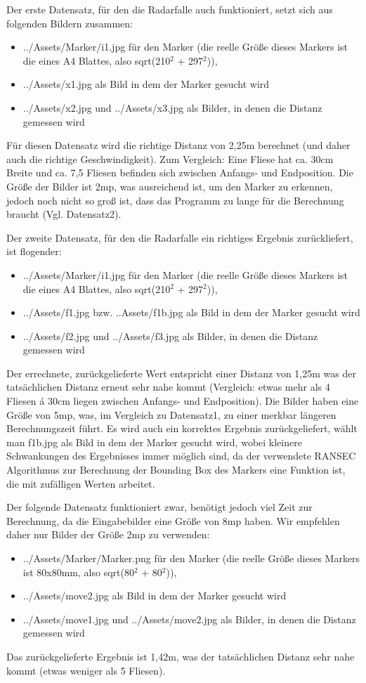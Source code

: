 \documentclass[deutsch]{scrartcl}
\begin{document}
Der erste Datensatz, für den die Radarfalle auch funktioniert, setzt sich aus folgenden Bildern zusammen: 
\begin{itemize}
	\item ../Assets/Marker/i1.jpg für den Marker (die reelle Größe dieses Markers ist die eines A4 Blattes, also sqrt(210$^2$ + 297$^2$)), 
	\item ../Assets/x1.jpg als Bild in dem der Marker gesucht wird
	\item ../Assets/x2.jpg und ../Assets/x3.jpg als Bilder, in denen die Distanz gemessen wird
\end{itemize}
Für diesen Datensatz wird die richtige Distanz von 2,25m berechnet (und daher auch die richtige Geschwindigkeit). Zum Vergleich: Eine Fliese hat ca. 30cm Breite und ca. 7,5 Fliesen befinden sich zwischen Anfangs- und Endposition. Die Größe der Bilder ist 2mp, was ausreichend ist, um den Marker zu erkennen, jedoch noch nicht so groß ist, dass das Programm zu lange für die Berechnung braucht (Vgl. Datensatz2).

Der zweite Datensatz, für den die Radarfalle ein richtiges Ergebnis zurückliefert, ist flogender:
\begin{itemize}
	\item ../Assets/Marker/i1.jpg für den Marker (die reelle Größe dieses Markers ist die eines A4 Blattes, also sqrt(210$^2$ + 297$^2$)), 
	\item ../Assets/f1.jpg bzw. ..Assets/f1b.jpg als Bild in dem der Marker gesucht wird
	\item ../Assets/f2.jpg und ../Assets/f3.jpg als Bilder, in denen die Distanz gemessen wird
\end{itemize}
Der errechnete, zurückgelieferte Wert entspricht einer Distanz von 1,25m was der tatsächlichen Distanz erneut sehr nahe kommt (Vergleich: etwas mehr als 4 Fliesen á 30cm liegen zwischen Anfangs- und Endposition). Die Bilder haben eine Größe von 5mp, was, im Vergleich zu Datensatz1, zu einer merkbar längeren Berechnungszeit führt. Es wird auch ein korrektes Ergebnis zurückgeliefert, wählt man f1b.jpg als Bild in dem der Marker gesucht wird, wobei kleinere Schwankungen des Ergebnisses immer möglich sind, da der verwendete RANSEC Algorithmus zur Berechnung der Bounding Box des Markers eine Funktion ist, die mit zufälligen Werten arbeitet.

Der folgende Datensatz funktioniert zwar, benötigt jedoch viel Zeit zur Berechnung, da die Eingabebilder eine Größe von 8mp haben. Wir empfehlen daher nur Bilder der Größe 2mp zu verwenden:
\begin{itemize}
	\item ../Assets/Marker/Marker.png für den Marker (die reelle Größe dieses Markers ist 80x80mm, also sqrt(80$^2$ + 80$^2$)), 
	\item ../Assets/move2.jpg als Bild in dem der Marker gesucht wird
	\item ../Assets/move1.jpg und ../Assets/move2.jpg als Bilder, in denen die Distanz gemessen wird
\end{itemize}
Das zurückgelieferte Ergebnis ist 1,42m, was der tatsächlichen Distanz sehr nahe kommt (etwas weniger als 5 Fliesen).
\end{document}
